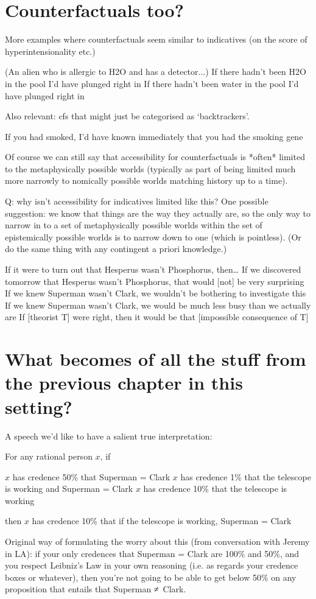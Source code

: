 \documentclass[If.tex]{subfiles}
\begin{document}
\section{Counterfactuals too?}
More examples where counterfactuals seem similar to indicatives (on the score of hyperintensionality etc.)

(An alien who is allergic to H2O and has a detector...)
If there hadn't been H2O in the pool I'd have plunged right in
If there hadn't been water in the pool I'd have plunged right in

Also relevant: cfs that might just be categorised as ‘backtrackers’.  

If you had smoked, I'd have known immediately that you had the smoking gene

Of course we can still say that accessibility for counterfactuals is *often* limited to the metaphysically possible worlds (typically as part of being limited much more narrowly to nomically possible worlds matching history up to a time).  

Q: why isn't accessibility for indicatives limited like this?  One possible suggestion: we know that things are the way they actually are, so the only way to narrow in to a set of metaphysically possible worlds within the set of epistemically possible worlds is to narrow down to one (which is pointless).  (Or do the same thing with any contingent a priori knowledge.)

	
			If it were to turn out that Hesperus wasn't Phosphorus, then…
			If we discovered tomorrow that Hesperus wasn't Phosphorus, that would [not] be very surprising
			If we knew Superman wasn't Clark, we wouldn't be bothering to investigate this
			If we knew Superman wasn't Clark, we would be much less busy than we actually are
			If [theorist T] were right, then it would be that [impossible consequence of T]
			



\section{What becomes of all the stuff from the previous chapter in this setting?}

A speech we'd like to have a salient true interpretation:

For any rational person $x$, if
\begin{prop}
	\ritem
	$x$ has credence 50\% that Superman = Clark
	\ritem
	$x$ has credence 1\% that the telescope is working and Superman = Clark
	\ritem
	$x$ has credence 10\% that the telescope is working
\end{prop}
then $x$ has credence 10\% that if the telescope is working, Superman = Clark

Original way of formulating the worry about this (from conversation with Jeremy in LA): if your only credences that Superman = Clark are 100\% and 50\%, and you respect Leibniz's Law in your own reasoning (i.e. as regards your credence boxes or whatever), then you're not going to be able to get below 50\% on any proposition that entails that Superman ≠ Clark.  
\end{document}
